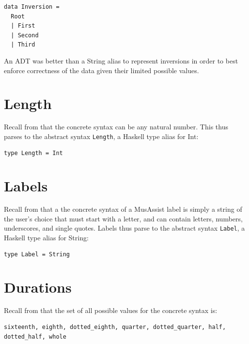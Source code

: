 \documentclass{report}
\newcommand\param[1]{\textttu{<#1>}}
\begin{document}
\begin{verbatim}
data Inversion = 
  Root 
  | First 
  | Second 
  | Third
\end{verbatim}

An ADT was better than a String alias to represent inversions in order to best enforce correctness of the data given their limited possible values. 

\section{Length}

Recall from  that the concrete syntax \param{LENGTH} can be any natural number. This thus parses to the abstract syntax \verb.Length., a Haskell type alias for Int:

\begin{verbatim}
type Length = Int
\end{verbatim}
 
\section{Labels}
Recall from  that a the concrete syntax of a MusAssist label is simply a string of the user's choice that must start with a letter, and can contain letters, numbers, underscores, and single quotes. Labels thus parse to the abstract syntax \verb.Label., a Haskell type alias for String:

\begin{verbatim}
type Label = String
\end{verbatim}

\section{Durations}
Recall from  that the set of all possible values for the concrete syntax \param{DURATION} is:

\begin{verbatim}
sixteenth, eighth, dotted_eighth, quarter, dotted_quarter, half, dotted_half, whole
\end{verbatim}
\end{document}

